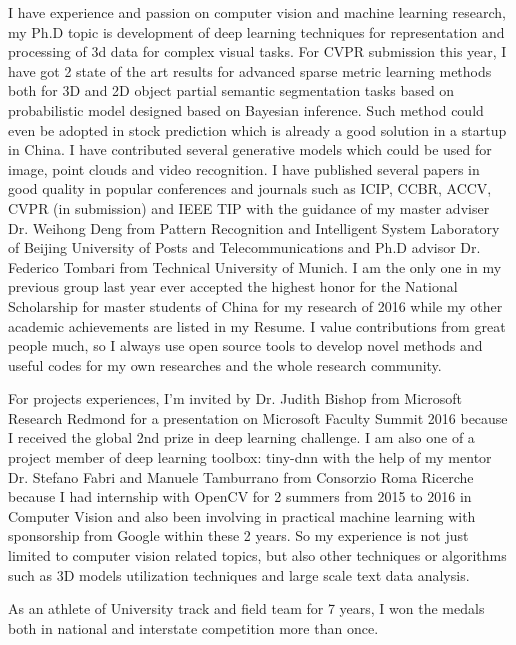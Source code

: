 \documentclass[11pt, a4paper]{awesome-cv} %
\begin{document}
I have experience and passion on computer vision and machine learning research, my Ph.D topic is development of deep learning techniques for representation and processing of 3d data for complex visual tasks. 
For CVPR submission this year, I have got 2 state of the art results for advanced sparse metric learning methods both for 3D and 2D object partial semantic segmentation tasks based on probabilistic model designed based on Bayesian inference. 
Such method could even be adopted in stock prediction which is already a good solution in a startup in China.
I have contributed several generative models which could be used for image, point clouds and video recognition. 
I have published several papers in good quality in popular conferences and journals such as ICIP, CCBR, ACCV, CVPR (in submission) and IEEE TIP with the guidance of my master adviser Dr. Weihong Deng from Pattern Recognition and Intelligent System Laboratory of Beijing University of Posts and Telecommunications and Ph.D advisor Dr. Federico Tombari from Technical University of Munich. 
I am the only one in my previous group last year ever accepted the highest honor for the National Scholarship for master students of China for my research of 2016 while my other academic achievements are listed in my Resume. 
I value contributions from great people much, so I always use open source tools to develop novel methods and useful codes for my own researches and the whole research community. 

For projects experiences, I’m invited by Dr. Judith Bishop from Microsoft Research Redmond for a presentation on Microsoft Faculty Summit 2016 because I received the global 2nd prize in deep learning challenge. I am also one of a project member of deep learning toolbox: tiny-dnn with the help of my mentor Dr. Stefano Fabri and Manuele Tamburrano from Consorzio Roma Ricerche because I had internship with OpenCV for 2 summers from 2015 to 2016 in Computer Vision and also been involving in practical machine learning with sponsorship from Google within these 2 years. So my experience is not just limited to computer vision related topics, but also other techniques or algorithms such as 3D models utilization techniques and large scale text data analysis.

As an athlete of University track and field team for 7 years, I won the medals both in national and interstate competition more than once. 

\end{document}
